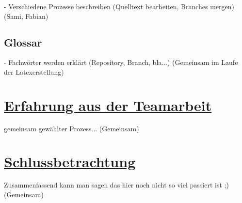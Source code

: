 \documentclass[a4paper]{article}
\begin{document}
	 - Verschiedene Prozesse beschreiben (Quelltext bearbeiten, Branches mergen) (Sami, Fabian)
	 
\subsection{Glossar}	

	 - Fachwörter werden erklärt (Repository, Branch, bla...) (Gemeinsam im Laufe der Latexerstellung) 
	
\section{\underline{Erfahrung aus der Teamarbeit}}

	gemeinsam gewählter Prozess...
	(Gemeinsam)


\section{\underline{Schlussbetrachtung}}
	
	Zusammenfassend kann man sagen das hier noch nicht so viel passiert ist ;)	
	(Gemeinsam)

	
\end{document}
